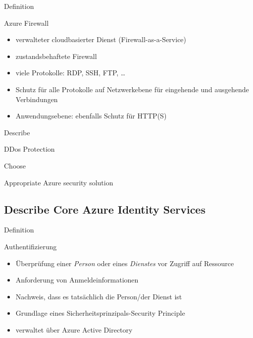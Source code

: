\documentclass{scrartcl}
\newenvironment{flashcard}[2][]{%
    #1
    \vfill
    \centerline{\Large{#2}}
    \vfill
\newpage
}
{\newpage}
\newcommand{\subsectioncard}[1]{
    \vspace*{\stretch{1}}
    \subsection{#1}
    \vspace*{\stretch{1}}
    \pagebreak
}
\begin{document}
    \begin{flashcard}[Definition]{Azure Firewall}
        \begin{itemize}
            \item verwalteter cloudbasierter Dienst (Firewall-as-a-Service)
            \item zustandsbehaftete Firewall
            \item viele Protokolle: RDP, SSH, FTP, \ldots
            \item Schutz für alle Protokolle auf Netzwerkebene für eingehende und ausgehende Verbindungen
            \item Anwendungsebene: ebenfalls Schutz für HTTP(S)
        \end{itemize}

    \end{flashcard}

    \begin{flashcard}[Describe]{DDos Protection}

    \end{flashcard}

    \begin{flashcard}[Choose]{Appropriate Azure security solution}

    \end{flashcard}

    \subsectioncard{Describe Core Azure Identity Services}

    \begin{flashcard}[Definition]{Authentifizierung}
        \begin{itemize}
            \item Überprüfung einer \emph{Person} oder eines \emph{Dienstes} vor Zugriff auf Ressource
            \item Anforderung von Anmeldeinformationen
            \item Nachweis, dass es tatsächlich die Person/der Dienst ist
            \item Grundlage eines Sicherheitsprinzipals-Security Principle
            \item verwaltet über Azure Active Directory
        \end{itemize}
    \end{flashcard}
\end{document}
